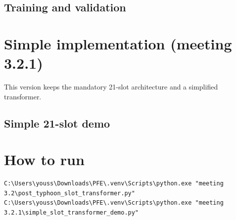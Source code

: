 \documentclass[11pt]{article}
\begin{document}
\subsection{Training and validation}


\section{Simple implementation (meeting 3.2.1)}
This version keeps the mandatory 21-slot architecture and a simplified transformer.

\subsection{Simple 21-slot demo}


\section{How to run}
\begin{verbatim}
C:\Users\youss\Downloads\PFE\.venv\Scripts\python.exe "meeting 3.2\post_typhoon_slot_transformer.py"
C:\Users\youss\Downloads\PFE\.venv\Scripts\python.exe "meeting 3.2.1\simple_slot_transformer_demo.py"
\end{verbatim}
\end{document}
